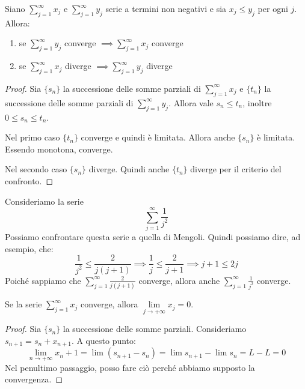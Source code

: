 \begin{proposition}
Siano $\sum_{j=1}^\infty x_j$ e $\sum_{j=1}^\infty y_j$ serie a termini non negativi e sia $x_j \le y_j$ per ogni $j$. Allora:
\begin{enumerate}
\item se $\sum_{j=1}^\infty y_j$ converge $\implies \sum_{j=1}^\infty x_j$ converge
\item se $\sum_{j=1}^\infty x_j$ diverge $\implies \sum_{j=1}^\infty y_j$ diverge
\end{enumerate}
\end{proposition}

\begin{proof}
Sia $\{s_n\}$ la successione delle somme parziali di $\sum_{j=1}^\infty x_j$ e $\{t_n\}$ la successione delle somme parziali di $\sum_{j=1}^\infty y_j$. Allora vale $s_n \le t_n$, inoltre $0 \le s_n \le t_n$.

Nel primo caso $\{t_n\}$ converge e quindi è limitata. Allora anche $\{s_n\}$ è limitata. Essendo monotona, converge.

Nel secondo caso $\{s_n\}$ diverge. Quindi anche $\{t_n\}$ diverge per il criterio del confronto.
\end{proof}

\begin{example}
Consideriamo la serie 
\begin{equation*}
\sum_{j=1}^\infty \frac{1}{j^2}
\end{equation*}
Possiamo confrontare questa serie a quella di Mengoli. Quindi possiamo dire, ad esempio, che:
\begin{equation*}
\frac{1}{j^2} \le \frac{2}{j(j+1)} \implies \frac{1}{j} \le \frac{2}{j+1} \implies j+1 \le 2j
\end{equation*}
Poiché sappiamo che $\sum_{j=1}^\infty \frac{2}{j(j+1)}$ converge, allora anche $\sum_{j=1}^\infty \frac{1}{j^2}$ converge.
\end{example}

\begin{proposition}
Se la serie $\sum_{j=1}^\infty x_j$ converge, allora $\lim\limits_{j \to +\infty} x_j = 0$.
\end{proposition}

\begin{proof}
Sia $\{s_n\}$ la successione delle somme parziali. Consideriamo $s_{n+1} = s_n + x_{n+1}$. A questo punto:
\begin{equation*}
\lim_{n \to +\infty} x_n+1 = \lim (s_{n+1} - s_n) = \lim s_{n+1} - \lim s_n = L - L = 0
\end{equation*}
Nel penultimo passaggio, posso fare ciò perché abbiamo supposto la convergenza.
\end{proof}

